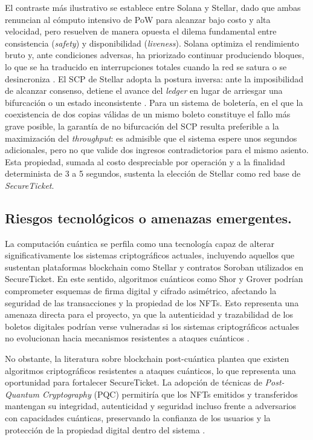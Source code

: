 El contraste más ilustrativo se establece entre Solana y Stellar, dado que ambas renuncian al cómputo
intensivo de PoW para alcanzar bajo costo y alta velocidad, pero resuelven de manera opuesta el dilema
fundamental entre consistencia (\textit{safety}) y disponibilidad (\textit{liveness}). Solana optimiza el
rendimiento bruto y, ante condiciones adversas, ha priorizado continuar produciendo bloques, lo que se ha
traducido en interrupciones totales cuando la red se satura o se desincroniza \cite{helius2024solana}. El
SCP de Stellar adopta la postura inversa: ante la imposibilidad de alcanzar consenso, detiene el avance del
\textit{ledger} en lugar de arriesgar una bifurcación o un estado inconsistente \cite{mazieres2015stellar}.
Para un sistema de boletería, en el que la coexistencia de dos copias válidas de un mismo boleto constituye
el fallo más grave posible, la garantía de no bifurcación del SCP resulta preferible a la maximización del
\textit{throughput}: es admisible que el sistema espere unos segundos adicionales, pero no que valide dos
ingresos contradictorios para el mismo asiento. Esta propiedad, sumada al costo despreciable por operación y
a la finalidad determinista de 3 a 5 segundos, sustenta la elección de Stellar como red base de
\textit{SecureTicket}.

\subsection{Riesgos tecnológicos o amenazas emergentes.}
La computación cuántica se perfila como una tecnología capaz de alterar significativamente los sistemas criptográficos actuales, incluyendo aquellos que sustentan plataformas blockchain como Stellar y contratos Soroban utilizados en SecureTicket. En este sentido, algoritmos cuánticos como Shor y Grover podrían comprometer esquemas de firma digital y cifrado asimétrico, afectando la seguridad de las transacciones y la propiedad de los NFTs. Esto representa una amenaza directa para el proyecto, ya que la autenticidad y trazabilidad de los boletos digitales podrían verse vulneradas si los sistemas criptográficos actuales no evolucionan hacia mecanismos resistentes a ataques cuánticos \cite{postquantumblockchain}.

No obstante, la literatura sobre blockchain post-cuántica plantea que existen algoritmos criptográficos resistentes a ataques cuánticos, lo que representa una oportunidad para fortalecer SecureTicket. La adopción de técnicas de \textit{Post-Quantum Cryptography} (PQC) permitiría que los NFTs emitidos y transferidos mantengan su integridad, autenticidad y seguridad incluso frente a adversarios con capacidades cuánticas, preservando la confianza de los usuarios y la protección de la propiedad digital dentro del sistema \cite{postquantumblockchain}.

